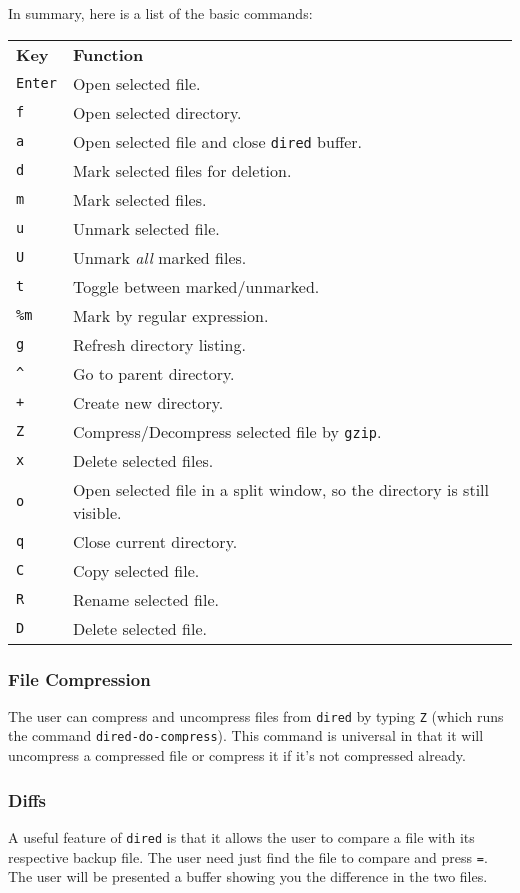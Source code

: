 \documentclass[12pt,a4paper,oneside]{article}
\begin{document}
In summary, here is a list of the basic commands:

\begin{tabular}{@{}ll@{}}
  \textbf{Key} & \textbf{Function}\\
  \texttt{Enter} & Open selected file.\\
  \texttt{f} & Open selected directory.\\
  \texttt{a} & Open selected file and close \texttt{dired} buffer.\\
  \texttt{d} & Mark selected files for deletion.\\
  \texttt{m} & Mark selected files.\\
  \texttt{u} & Unmark selected file.\\
  \texttt{U} & Unmark \emph{all} marked files.\\
  \texttt{t} & Toggle between marked/unmarked.\\
  \texttt{\%m} & Mark by regular expression.\\
  \texttt{g} & Refresh directory listing.\\
  \texttt{\^} & Go to parent directory.\\
  \texttt{+} & Create new directory.\\
  \texttt{Z} & Compress/Decompress selected file by \texttt{gzip}.\\
  \texttt{x} & Delete selected files.\\
  \texttt{o} & Open selected file in a split window, so the directory is still visible.\\
  \texttt{q} & Close current directory.\\
  \texttt{C} & Copy selected file.\\
  \texttt{R} & Rename selected file.\\
  \texttt{D} & Delete selected file.
\end{tabular}

\subsubsection{File Compression}
The user can compress and uncompress files from \texttt{dired} by typing \texttt{Z} (which runs the command \texttt{dired-do-compress}). This command is universal in that it will uncompress a compressed file or compress it if it's not compressed already.

\subsubsection{Diffs}
A useful feature of \texttt{dired} is that it allows the user to compare a file with its respective backup file. The user need just find the file to compare and press \texttt{=}. The user will be presented a buffer showing you the difference in the two files.
\end{document}

